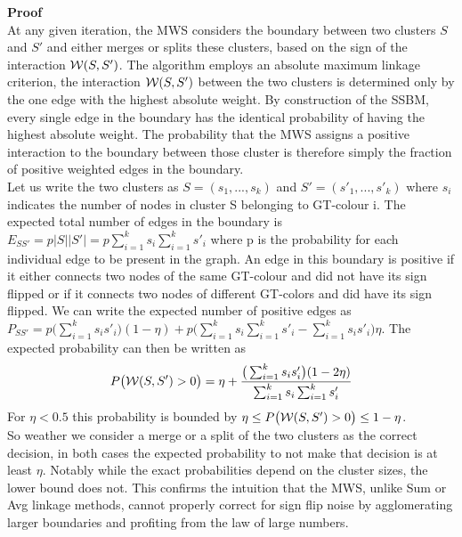\textbf{Proof} \\
At any given iteration, the MWS considers the boundary between two clusters $S$ and $S'$ and either merges or splits these clusters, based on the sign of the interaction $\mathcal{W}(S,S')$. The algorithm employs an absolute maximum linkage criterion, the interaction $\mathcal{W}(S,S')$ between the two clusters is determined only by the one edge with the highest absolute weight. By construction of the SSBM, every single edge in the boundary has the identical probability of having the highest absolute weight. The probability that the MWS assigns a positive interaction to the boundary between those cluster is therefore simply the fraction of positive weighted edges in the boundary. \\
Let us write the two clusters as $S=(s_1, ..., s_k)$ and $S'=(s'_1, ..., s'_k)$ where $s_i$ indicates the number of nodes in cluster S belonging to GT-colour i. The expected total number of edges in the boundary is $E_{SS'}=p|S||S'|=p\sum_{i=1}^{k}s_i \sum_{i=1}^{k}s'_i$ where p is the probability for each individual edge to be present in the graph. An edge in this boundary is positive if it either connects two nodes of the same GT-colour and did not have its sign flipped or if it connects two nodes of different GT-colors and did have its sign flipped. We can write the expected number of positive edges as $P_{SS'}=p\big(\sum_{i=1}^{k}s_is'_i\big)(1-\eta)+p\big(\sum_{i=1}^{k}s_i \sum_{i=1}^{k}s'_i - \sum_{i=1}^{k}s_is'_i\big)\eta$. The expected probability can then be written as 
\begin{equation}
    P\big(\mathcal{W}(S,S')>0\big)=\eta +  \frac{\big(\sum_{i=1}^{k}s_is'_i\big)(1-2\eta)}{\sum_{i=1}^{k}s_i \sum_{i=1}^{k}s'_i}
\end{equation}
For $\eta <0.5$ this probability is bounded by $\eta \leq P\big(\mathcal{W}(S,S')>0\big) \leq 1-\eta$. \\
So weather we consider a merge or a split of the two clusters as the correct decision, in both cases the expected probability to not make that decision is at least $\eta$. Notably while the exact probabilities depend on the cluster sizes, the lower bound does not. This confirms the intuition that the MWS, unlike Sum or Avg linkage methods, cannot properly correct for sign flip noise by agglomerating larger boundaries and profiting from the law of large numbers. 


